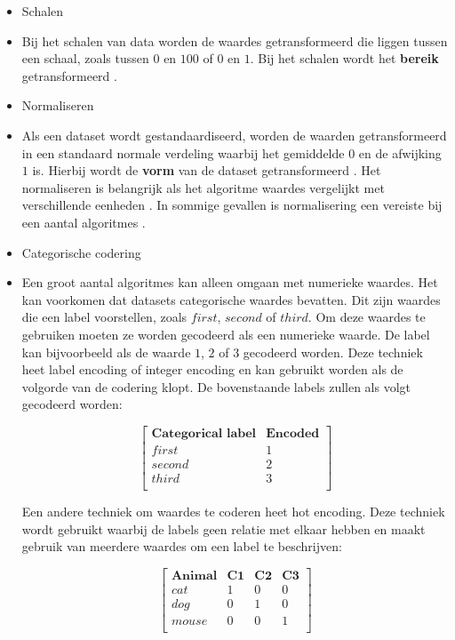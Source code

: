 \begin{itemize}
  \item Schalen
  \item[] Bij het schalen van data worden de waardes getransformeerd die liggen tussen een schaal, zoals tussen \(0\) en \(100\) of \(0\) en \(1\). Bij het schalen wordt het \textbf{bereik} getransformeerd \cite{scale-and-normalize-data}. 
  \item Normaliseren
  \item[] Als een dataset wordt gestandaardiseerd, worden de waarden getransformeerd in een standaard normale verdeling waarbij het gemiddelde \(0\) en de afwijking \(1\) is. Hierbij wordt de \textbf{vorm} van de dataset getransformeerd \cite{scale-and-normalize-data}. Het normaliseren is belangrijk als het algoritme waardes vergelijkt met verschillende eenheden \cite{feature-scaling-standardization}. In sommige gevallen is normalisering een vereiste bij een aantal algoritmes \cite{data-transformation-standardization-vs-normalization}.
  \item Categorische codering
  \item[] Een groot aantal algoritmes kan alleen omgaan met numerieke waardes. Het kan voorkomen dat datasets categorische waardes bevatten. Dit zijn waardes die een label voorstellen, zoals \(first\), \(second\) of \(third\). Om deze waardes te gebruiken moeten ze worden gecodeerd als een numerieke waarde. De label kan bijvoorbeeld als de waarde \(1\), \(2\) of \(3\) gecodeerd worden. Deze techniek heet label encoding of integer encoding en kan gebruikt worden als de volgorde van de codering klopt. De bovenstaande labels zullen als volgt gecodeerd worden:
  \begin{center}
    $$\begin{bmatrix}
      \textbf{Categorical label} & \textbf{Encoded} \\
      first & 1 \\
      second & 2 \\
      third & 3 \\
    \end{bmatrix}$$
  \end{center}
  
  Een andere techniek om waardes te coderen heet hot encoding. Deze techniek wordt gebruikt waarbij de labels geen relatie met elkaar hebben en maakt gebruik van meerdere waardes om een label te beschrijven:
  \begin{center}
    $$\begin{bmatrix}
      \textbf{Animal} & \textbf{C1} & \textbf{C2} & \textbf{C3}\\
      cat & 1 & 0 & 0 \\
      dog & 0 & 1 & 0 \\
      mouse & 0 & 0 & 1 \\
    \end{bmatrix}$$
  \end{center}


\end{itemize}


